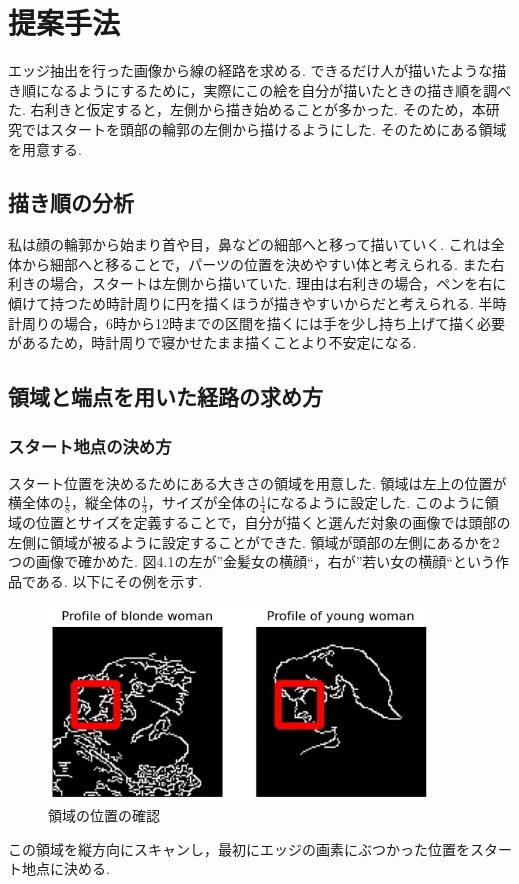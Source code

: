 \chapter{提案手法}
  \label{sec:method}
  エッジ抽出を行った画像から線の経路を求める. できるだけ人が描いたような描き順になるようにするために，実際にこの絵を自分が描いたときの描き順を調べた. 右利きと仮定すると，左側から描き始めることが多かった. そのため，本研究ではスタートを頭部の輪郭の左側から描けるようにした. そのためにある領域を用意する.
  \section{描き順の分析}
  \label{sec:analysis }
  私は顔の輪郭から始まり首や目，鼻などの細部へと移って描いていく. これは全体から細部へと移ることで，パーツの位置を決めやすい体と考えられる. また右利きの場合，スタートは左側から描いていた. 理由は右利きの場合，ペンを右に傾けて持つため時計周りに円を描くほうが描きやすいからだと考えられる. 
  半時計周りの場合，6時から12時までの区間を描くには手を少し持ち上げて描く必要があるため，時計周りで寝かせたまま描くことより不安定になる.
	\section{領域と端点を用いた経路の求め方}
    \label{sec:the way of the route}
	\subsection{スタート地点の決め方}
	\label{sec:how to define the start point}
	スタート位置を決めるためにある大きさの領域を用意した. 領域は左上の位置が横全体の$\frac{1}{8}$，縦全体の$\frac{1}{3}$，サイズが全体の$\frac{1}{4}$になるように設定した. 
	このように領域の位置とサイズを定義することで，自分が描くと選んだ対象の画像では頭部の左側に領域が被るように設定することができた. 領域が頭部の左側にあるかを2つの画像で確かめた. 図4.1の左が''金髪女の横顔``，右が''若い女の横顔``という作品である. 以下にその例を示す. 
	  \begin{center}
        \begin{figure}[h]
            \includegraphics[width=0.90\textwidth]{./img/003.png}
            \caption{領域の位置の確認}
            \label{the position of a region}
        \end{figure}
    \end{center}
	この領域を縦方向にスキャンし，最初にエッジの画素にぶつかった位置をスタート地点に決める.

